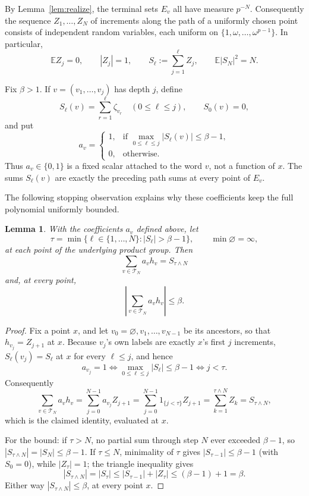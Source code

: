 \documentclass[11pt]{amsart}
\newtheorem{lemma}[theorem]{Lemma}
\theoremstyle{definition}
\theoremstyle{remark}
\newcommand{\T}{\mathcal T}
\newcommand{\E}{\mathbb E}
\begin{document}
By Lemma~\ref{lem:realize}, the terminal sets $E_v$ all have measure
\(p^{-N}\). Consequently the sequence \(Z_1,\ldots,Z_N\) of
increments along the path of a uniformly chosen point consists of
independent random variables, each uniform on
\(\{1,\omega,\ldots,\omega^{p-1}\}\). In particular,
\[
 \E Z_j=0,\qquad |Z_j|=1,\qquad
 S_\ell:=\sum_{j=1}^{\ell}Z_j,\qquad \E|S_N|^2=N.
\]

Fix \(\beta>1\). If \(v=(v_1,\ldots,v_j)\) has depth \(j\), define
\[
 S_\ell(v)=\sum_{r=1}^{\ell}\zeta_{v_r}
 \quad(0\leq\ell\leq j),\qquad S_0(v)=0,
\]
and put
\[
 a_v=
 \begin{cases}
  1,&\text{if }\max_{0\leq\ell\leq j}|S_\ell(v)|\leq\beta-1,\\
  0,&\text{otherwise}.
 \end{cases}
\]
Thus \(a_v\in\{0,1\}\) is a fixed scalar attached to the word \(v\),
not a function of \(x\). The sums \(S_\ell(v)\) are exactly the
preceding path sums at every point of \(E_v\).

The following stopping observation explains why these coefficients keep
the full polynomial uniformly bounded.

\begin{lemma}\label{lem:stopping}
With the coefficients \(a_v\) defined above, let
\[
 \tau=\min\{\ell\in\{1,\ldots,N\}:|S_\ell|>\beta-1\},
 \qquad \min\varnothing=\infty,
\]
at each point of the underlying product group. Then
\[
 \sum_{v\in\T_N}a_vh_v=S_{\tau\wedge N}
\]
and, at every point,
\begin{equation}
 \left|\sum_{v\in\T_N}a_vh_v\right|\leq \beta.
\end{equation}
\end{lemma}

\begin{proof}
Fix a point \(x\), and let \(v_0=\varnothing,v_1,\ldots,v_{N-1}\) be
its ancestors, so that \(h_{v_j}=Z_{j+1}\) at \(x\). Because \(v_j\)'s
own labels are exactly \(x\)'s first \(j\) increments,
\(S_\ell(v_j)=S_\ell\) at \(x\) for every \(\ell\leq j\), and hence
\[
 a_{v_j}=1
 \iff \max_{0\leq \ell\leq j}|S_\ell|\leq\beta-1
 \iff j<\tau.
\]
Consequently
\[
 \sum_{v\in\T_N}a_vh_v
 =\sum_{j=0}^{N-1}a_{v_j}Z_{j+1}
 =\sum_{j=0}^{N-1}1_{\{j<\tau\}}Z_{j+1}
 =\sum_{k=1}^{\tau\wedge N}Z_k
 =S_{\tau\wedge N},
\]
which is the claimed identity, evaluated at \(x\).

For the bound: if \(\tau>N\), no partial sum through step \(N\) ever
exceeded \(\beta-1\), so \(|S_{\tau\wedge N}|=|S_N|\leq\beta-1\). If
\(\tau\leq N\), minimality of \(\tau\) gives \(|S_{\tau-1}|\leq\beta-1\)
(with \(S_0=0\)), while \(|Z_\tau|=1\); the triangle inequality gives
\[
 |S_{\tau\wedge N}|=|S_\tau|
 \leq|S_{\tau-1}|+|Z_\tau|
 \leq(\beta-1)+1=\beta.
\]
Either way \(|S_{\tau\wedge N}|\leq\beta\), at every point \(x\).
\end{proof}
\end{document}
